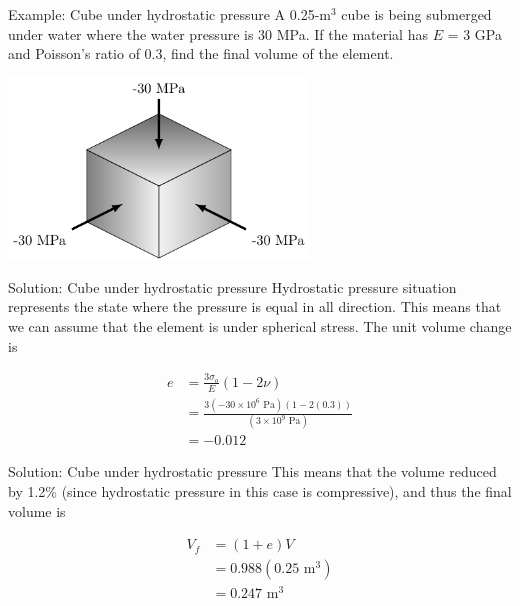 \documentclass[10pt, svgnames]{beamer}
\begin{document}
\begin{frame}[label={sec:orgd39ef5b}]{Example: Cube under hydrostatic pressure}
A 0.25-m\(^3\) cube is being submerged under water where the water pressure is 30 MPa. If the material has \(E\) = 3 GPa and Poisson's ratio of 0.3, find the final volume of the element.

\begin{center}
\includegraphics[width=0.6\textwidth]{pictures/cube-under-hydro-pressure.pdf}
\end{center}
\end{frame}

\begin{frame}[label={sec:orgb817162}]{Solution: Cube under hydrostatic pressure}
Hydrostatic pressure situation represents the state where the pressure is equal in all direction. This means that we can assume that the element is under spherical stress. The unit volume change is

\begin{align*}
  e &= \frac{3\sigma_o}{E}(1 - 2\nu ) \\ 
    &= \frac{3(-30 \times 10^6 \text{ Pa})(1 - 2(0.3))}{(3 \times 10^9 \text{ Pa})} \\ 
    &= -0.012 
\end{align*}
\end{frame}

\begin{frame}[label={sec:org66f585e}]{Solution: Cube under hydrostatic pressure}
This means that the volume reduced by 1.2\% (since hydrostatic pressure in this case is compressive), and thus the final volume is

\begin{align*}
  V_f &= (1 + e)V \\ 
      &= 0.988(0.25 \text{ m}^3) \\ 
      &= 0.247 \text{ m}^3
\end{align*}
\end{frame}
\end{document}
